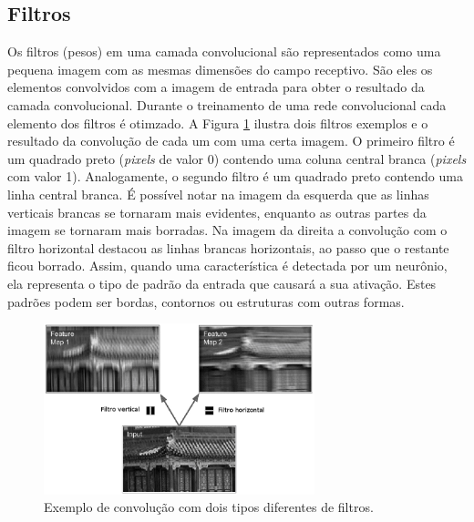 \subsection{Filtros}
Os filtros (pesos) em uma camada convolucional são representados como uma pequena
imagem com as mesmas dimensões do campo receptivo. São eles os elementos
convolvidos com a imagem de entrada para obter o resultado da camada convolucional.
Durante o treinamento de uma rede convolucional cada elemento dos filtros é otimzado.
A Figura \ref{fig:conv_filt} ilustra dois filtros exemplos e o resultado da convolução
de cada um com uma certa imagem. O primeiro filtro é um quadrado preto
(\textit{pixels} de valor 0) contendo uma coluna central branca (\textit{pixels} com valor 1). 
Analogamente, o segundo filtro é um quadrado preto contendo uma linha central branca.
É possível notar na imagem da esquerda que as linhas verticais brancas se tornaram mais
evidentes, enquanto as outras partes da imagem se tornaram mais borradas. Na imagem da direita 
a convolução com o filtro horizontal destacou as linhas brancas horizontais, ao passo que
o restante ficou borrado. Assim, quando uma característica é detectada por um neurônio, ela representa
o tipo de padrão da entrada que causará a sua ativação.
Estes padrões podem ser bordas, contornos ou estruturas com outras formas.
\begin{figure}[htp]
\begin{center}
  \includegraphics[width=0.7\textwidth]{fig/conv_filt}
  \caption{Exemplo de convolução com dois tipos diferentes de filtros. \citep{aurelien17}}
  \label{fig:conv_filt}
\end{center}
\end{figure}

